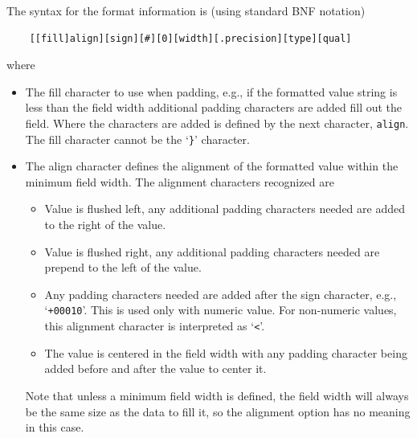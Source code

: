 The syntax for the format information is (using standard BNF notation)
\begin{small}
\begin{center}
\begin{verbatim}
    [[fill]align][sign][#][0][width][.precision][type][qual]
\end{verbatim}
\end{center}
\end{small}
where
\begin{itemize}
\item[\textit{fill}]
    The fill character to use when padding, e.g., if the formatted value
    string is less than the field width additional padding characters
    are added fill out the field.  Where the characters are added is
    defined by the next character, \texttt{align}.  The fill character
    cannot be the `\texttt{\}}' character.

\item[\textit{align}]
    The align character defines the alignment of the formatted value
    within the minimum field width.  The alignment characters recognized are
    \begin{itemize}
    \item[`\texttt{<}'] Value is flushed left, any additional padding
        characters needed are added to the right of the value.
    \item[`\texttt{>}'] Value is flushed right, any additional padding
        characters needed are prepend to the left of the value.
    \item[`\texttt{=}'] Any padding characters needed are added after the
        sign character, e.g., `\texttt{+00010}'.  This is used only with
        numeric value.  For non-numeric values, this alignment character is
        interpreted as `\texttt{<}'.
    \item[`\texttt{\^}'] The value is centered in the field width with any
        padding character being added before and after the value to center
        it.
    \end{itemize}
    Note that unless a minimum field width is defined, the field width
    will always be the same size as the data to fill it, so the
    alignment option has no meaning in this case.


\end{itemize}
